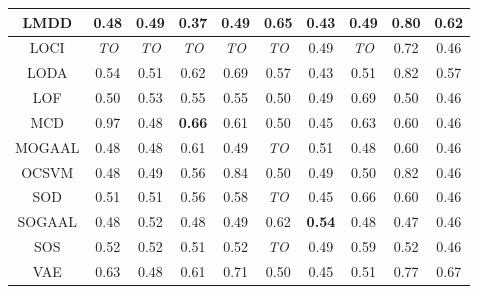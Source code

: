 \begin{table*}[!b]
\begin{tabular}{|c|c|c|c|c|c|c|c|c|c|}
                LMDD &          0.48 &               0.49 &          0.37 &                0.49 &          0.65 &               0.43 &            0.49 &          0.80 &          0.62 \\
\hline
                LOCI &   \textit{TO} &        \textit{TO} &   \textit{TO} &         \textit{TO} &   \textit{TO} &               0.49 &     \textit{TO} &          0.72 &          0.46 \\
\hline
                LODA &          0.54 &               0.51 &          0.62 &                0.69 &          0.57 &               0.43 &            0.51 &          0.82 &          0.57 \\
\hline
                LOF &          0.50 &               0.53 &          0.55 &                0.55 &          0.50 &               0.49 &            0.69 &          0.50 &          0.46 \\
\hline
                MCD &          0.97 &               0.48 & \textbf{0.66} &                0.61 &          0.50 &               0.45 &            0.63 &          0.60 &          0.46 \\
\hline
        MOGAAL &          0.48 &               0.48 &          0.61 &                0.49 &   \textit{TO} &               0.51 &            0.48 &          0.60 &          0.46 \\
\hline
                OCSVM &          0.48 &               0.49 &          0.56 &                0.84 &          0.50 &               0.49 &            0.50 &          0.82 &          0.46 \\
\hline
                SOD &          0.51 &               0.51 &          0.56 &                0.58 &   \textit{TO} &               0.45 &            0.66 &          0.60 &          0.46 \\
\hline
        SOGAAL &          0.48 &               0.52 &          0.48 &                0.49 &          0.62 &      \textbf{0.54} &            0.48 &          0.47 &          0.46 \\
\hline
                SOS &          0.52 &               0.52 &          0.51 &                0.52 &   \textit{TO} &               0.49 &            0.59 &          0.52 &          0.46 \\
\hline
                VAE &          0.63 &               0.48 &          0.61 &                0.71 &          0.50 &               0.45 &            0.51 &          0.77 &          0.67 \\
\hline
\end{tabular}
\end{table*}

